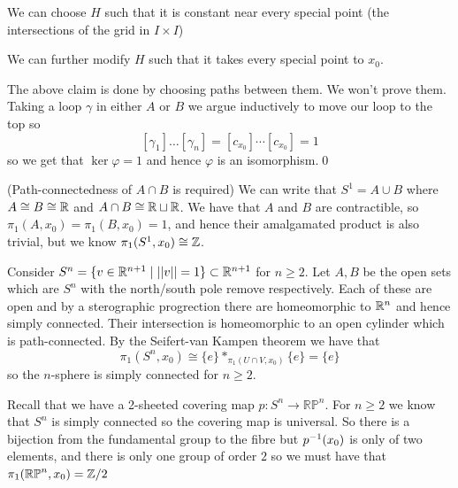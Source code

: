 \documentclass{article}
\begin{document}
\begin{claim}
  We can choose $ H $ such that it is constant near every special point (the intersections of the grid in $ I\times I $)
\end{claim}
\begin{claim}
  We can further modify $ H $ such that it takes every special point to $ x_0 $.
\end{claim}
The above claim is done by choosing paths between them. We won't prove them. Taking a loop $ \gamma $ in either $ A $ or $ B $ we argue inductively to move our loop to the top so
\[
	[\gamma_1]\dots [\gamma_n] = [c_{x_0}] \cdots [c_{x_0}] = 1
\]
so we get that $ \ker\varphi = 1 $ and hence $ \varphi $ is an isomorphism.\qed

\begin{example}
(Path-connectedness of $ A\cap B $ is required) We can write that $ S^1 = A \cup B $ where $ A\cong B \cong \mathbb{R} $ and $ A\cap B \cong \mathbb{R} \sqcup \mathbb{R} $. We have that $ A $ and $ B $ are contractible, so $ \pi_1(A,x_0)=  \pi_1(B,x_0) = 1 $, and hence their amalgamated product is also trivial, but we know $ \pi_1(S^1,x_0) \cong \mathbb{Z} $.
\end{example}
\begin{example}
	Consider $ S^n =\{ v\in \mathbb{R}^{n+1} \mid ||v|| = 1 \}\subset \mathbb{R}^{n+1} $ for $ n\ge 2 $. Let $ A, B $ be the open sets which are $ S^n $ with the north/south pole remove respectively. Each of these are open and by a sterographic progrection there are homeomorphic to $ \mathbb{R}^n $ and hence simply connected. Their intersection is homeomorphic to an open cylinder which is path-connected. By the Seifert-van Kampen theorem we have that
	\[
		\pi_1(S^n, x_0) \cong \{e\} *_{\pi_1(U\cap V,x_0)} \{e\} = \{e\}
	\]
	so the $ n $-sphere is simply connected for $ n\ge 2 $.
\end{example}
\begin{example}
Recall that we have a 2-sheeted covering map $ p: S^n \to \mathbb{RP}^n $. For $ n\ge 2 $ we know that $ S^n $ is simply connected so the covering map is universal. So there is a bijection from the fundamental group to the fibre but $ {p}^{-1}(x_0) $ is only of two elements, and there is only one group of order $ 2 $ so we must have that $ \pi_1(\mathbb{RP}^n, x_0) = \mathbb{Z}/2 $
\end{example}
\end{document}
